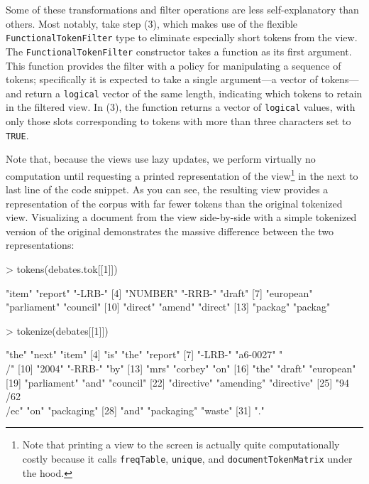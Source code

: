 \documentclass[11pt]{article}
\let\code=\texttt
\let\rclass=\texttt
\begin{document}
Some of these transformations and filter operations are less
self-explanatory than others.  Most notably, take step (3), which
makes use of the flexible \rclass{FunctionalTokenFilter} type to
eliminate especially short tokens from the view.  The
\rclass{FunctionalTokenFilter} constructor takes a function as its
first argument.  This function provides the filter with a policy for
manipulating a sequence of tokens; specifically it is expected to take
a single argument---a vector of tokens---and return a \code{logical}
vector of the same length, indicating which tokens to retain in the
filtered view.  In (3), the function returns a vector of
\code{logical} values, with only those slots corresponding to tokens
with more than three characters set to \code{TRUE}.

Note that, because the views use lazy updates, we perform virtually no
computation until requesting a printed representation of the
view\footnote{Note that printing a view to the screen is actually
quite computationally costly because it calls \code{freqTable},
\code{unique}, and \code{documentTokenMatrix} under the hood.} in the
next to last line of the code snippet.  As you can see, the resulting
view provides a representation of the corpus with far fewer tokens
than the original tokenized view.  Visualizing a document from the
view side-by-side with a simple tokenized version of the original
demonstrates the massive difference between the two representations:
\begin{Schunk}
\begin{Sinput}
> tokens(debates.tok[[1]])
\end{Sinput}
\begin{Soutput}
 [1] "item"       "report"     "-LRB-"     
 [4] "NUMBER"     "-RRB-"      "draft"     
 [7] "european"   "parliament" "council"   
[10] "direct"     "amend"      "direct"    
[13] "packag"     "packag"    
\end{Soutput}
\begin{Sinput}
> tokenize(debates[[1]])
\end{Sinput}
\begin{Soutput}
 [1] "the"          "next"         "item"        
 [4] "is"           "the"          "report"      
 [7] "-LRB-"        "a6-0027"      "\\/"         
[10] "2004"         "-RRB-"        "by"          
[13] "mrs"          "corbey"       "on"          
[16] "the"          "draft"        "european"    
[19] "parliament"   "and"          "council"     
[22] "directive"    "amending"     "directive"   
[25] "94\\/62\\/ec" "on"           "packaging"   
[28] "and"          "packaging"    "waste"       
[31] "."           
\end{Soutput}
\end{Schunk}
\end{document}
